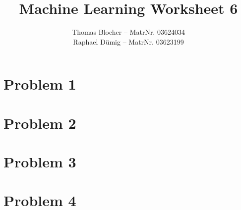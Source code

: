 \documentclass{scrartcl}
\title{Machine Learning Worksheet 6}
\author{Thomas Blocher -- MatrNr. 03624034 \\ Raphael D\"umig -- MatrNr. 03623199}
\begin{document}
\maketitle

\section*{Problem 1}


\section*{Problem 2}


\section*{Problem 3}


\section*{Problem 4}

\end{document}
